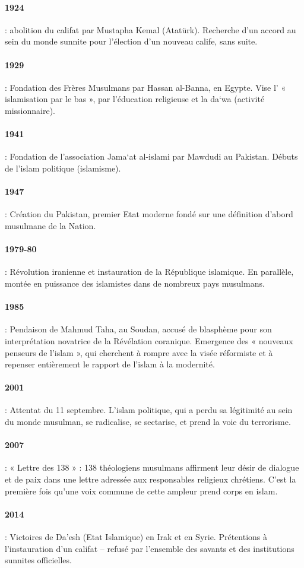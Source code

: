 \paragraph{1924 } : abolition du califat par Mustapha Kemal (Atatürk). Recherche d’un accord au sein du monde sunnite pour l’élection d’un nouveau calife, sans suite.
\paragraph{1929 } : Fondation des Frères Musulmans par Hassan al-Banna, en Egypte. Vise l’ « islamisation par le bas », par l’éducation religieuse et la da‘wa (activité missionnaire).
\paragraph{1941 } : Fondation de l’association Jama‘at al-islami par Mawdudi au Pakistan. Débuts de l’islam politique (islamisme).
\paragraph{1947 } : Création du Pakistan, premier Etat moderne fondé sur une définition d’abord musulmane de la Nation.
\paragraph{1979-80 } : Révolution iranienne et instauration de la République islamique. En parallèle, montée en puissance des islamistes dans de nombreux pays musulmans.
\paragraph{1985 } : Pendaison de Mahmud Taha, au Soudan, accusé de blasphème pour son interprétation novatrice de la Révélation coranique. Emergence des « nouveaux penseurs de l’islam », qui cherchent à rompre avec la visée réformiste et à repenser entièrement le rapport de l’islam à la modernité.
\paragraph{2001 } : Attentat du 11 septembre. L’islam politique, qui a perdu sa légitimité au sein du monde musulman, se radicalise, se sectarise, et prend la voie du terrorisme.

\paragraph{2007 } : « Lettre des 138 » : 138 théologiens musulmans affirment leur désir de dialogue et de paix dans une lettre adressée aux responsables religieux chrétiens. C’est la première fois qu’une voix commune de cette ampleur prend corps en islam.
\paragraph{2014 } : Victoires de Da’esh (Etat Islamique) en Irak et en Syrie. Prétentions à l’instauration d’un califat – refusé par l’ensemble des savants et des institutions sunnites officielles.
 